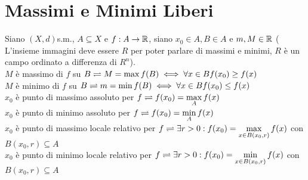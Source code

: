 \section{Massimi e Minimi Liberi}
Siano $(X,d)$s.m., $A\subseteq X$ e $f:A\rightarrow \mathbb{R}$, siano $x_0\in A, B\in A$ e $m,M\in \mathbb{R}$ ( L'insieme immagini deve essere $R$ per poter parlare di massimi e minimi, $R$ è un campo ordinato a differenza di $R^n$).\\
$M$ è massimo di $f$ su $B \rightleftharpoons M=\max f(B)\iff\forall x \in B f(x_0)\ge f(x)$\\
$M$ è minimo di $f$ su $B \rightleftharpoons m=\min f(B)\iff\forall x \in B f(x_0)\le f(x)$\\
$x_0$ è punto di massimo assoluto per $f \rightleftharpoons f(x_0)=\max\limits_{A}f(x)$\\
$x_0$ è punto di minimo assoluto per $f \rightleftharpoons f(x_0)=\min\limits_{A}f(x)$\\
$x_0$ è punto di massimo locale relativo per $f \rightleftharpoons \exists r>0: f(x_0)=\max\limits_{x\in B(x_0,r)}f(x)$ con $B(x_0,r)\subseteq A$\\
$x_0$ è punto di minimo locale relativo per $f \rightleftharpoons \exists r>0: f(x_0)=\min\limits_{x\in B(x_0,r)}f(x)$ con $B(x_0,r)\subseteq A$\\
